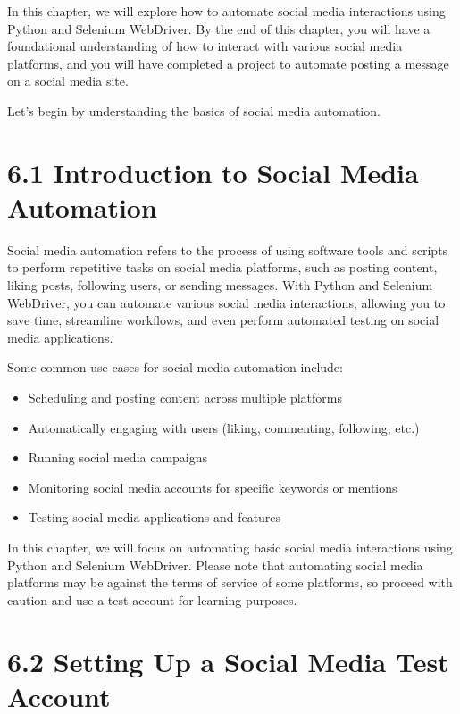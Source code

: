 \documentclass[
  paper=a4,
  ,captions=tableheading
]{scrartcl}
\providecommand{\tightlist}{%
  \setlength{\itemsep}{0pt}\setlength{\parskip}{0pt}}
\begin{document}
In this chapter, we will explore how to automate social media
interactions using Python and Selenium WebDriver. By the end of this
chapter, you will have a foundational understanding of how to interact
with various social media platforms, and you will have completed a
project to automate posting a message on a social media site.

Let's begin by understanding the basics of social media automation.

\hypertarget{introduction-to-social-media-automation}{%
\section{6.1 Introduction to Social Media
Automation}\label{introduction-to-social-media-automation}}

Social media automation refers to the process of using software tools
and scripts to perform repetitive tasks on social media platforms, such
as posting content, liking posts, following users, or sending messages.
With Python and Selenium WebDriver, you can automate various social
media interactions, allowing you to save time, streamline workflows, and
even perform automated testing on social media applications.

Some common use cases for social media automation include:

\begin{itemize}
\tightlist
\item
  Scheduling and posting content across multiple platforms
\item
  Automatically engaging with users (liking, commenting, following,
  etc.)
\item
  Running social media campaigns
\item
  Monitoring social media accounts for specific keywords or mentions
\item
  Testing social media applications and features
\end{itemize}

In this chapter, we will focus on automating basic social media
interactions using Python and Selenium WebDriver. Please note that
automating social media platforms may be against the terms of service of
some platforms, so proceed with caution and use a test account for
learning purposes.

\hypertarget{setting-up-a-social-media-test-account}{%
\section{6.2 Setting Up a Social Media Test
Account}\label{setting-up-a-social-media-test-account}}
\end{document}
